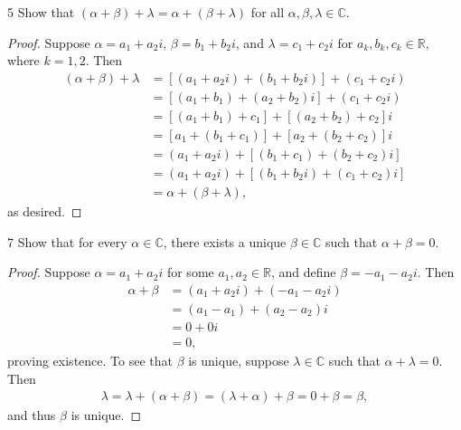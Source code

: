 \documentclass{extarticle}
\newenvironment{problem}[1]{\begin{prob*}{#1}{}}{\end{prob*}}
\newcommand{\R}{\mathbb{R}}
\newcommand{\C}{\mathbb{C}}
\begin{document}
\begin{problem}{5}
Show that $(\alpha + \beta) + \lambda = \alpha + (\beta + \lambda)$ for all $\alpha,\beta,\lambda\in\C$.
\end{problem}
\begin{proof}
Suppose $\alpha = a_1 + a_2i$, $\beta = b_1 + b_2i$, and $\lambda = c_1+c_2i$ for $a_k, b_k, c_k\in\R$, where $k=1,2$.  Then
\begin{align*}
(\alpha + \beta) + \lambda &= \left[(a_1 + a_2i) + (b_1 + b_2i)\right] + (c_1 + c_2i)\\
               	 			&= \left[(a_1 + b_1) + (a_2 + b_2)i\right]+ (c_1 + c_2i) \\
				 	&= \left[(a_1 + b_1) + c_1\right] + \left[(a_2 + b_2) + c_2\right]i \\
					&= \left[a_1 + (b_1+ c_1)\right] + \left[a_2 + (b_2 + c_2)\right]i\\
					&= (a_1 + a_2i) + \left[(b_1 + c_1) + (b_2 + c_2)i\right]\\
					&= (a_1 + a_2i) + \left[(b_1 + b_2i) + (c_1 + c_2)i\right]\\
					&= \alpha + (\beta + \lambda),
\end{align*}
as desired.
\end{proof}

\begin{problem}{7}
Show that for every $\alpha\in\C$, there exists a unique $\beta\in\C$ such that $\alpha + \beta = 0$.
\end{problem}
\begin{proof}
Suppose $\alpha = a_1 + a_2i$ for some $a_1,a_2\in\R$, and define $\beta = -a_1 - a_2i$.  Then
\begin{align*}
\alpha + \beta &= (a_1 + a_2i) + (-a_1 - a_2i)\\
                       &= (a_1 - a_1) + (a_2 - a_2)i\\
                       &= 0 + 0i\\
                       &= 0,
\end{align*}
proving existence.  To see that $\beta$ is unique, suppose  $\lambda\in\C$ such that $\alpha + \lambda = 0$.  Then
\begin{align*}
\lambda = \lambda + (\alpha + \beta) = (\lambda + \alpha) + \beta = 0 + \beta = \beta,
\end{align*}
and thus $\beta$ is unique.
\end{proof}
\end{document}
